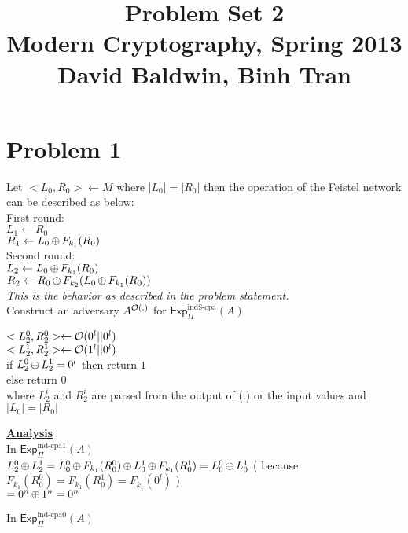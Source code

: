 \documentclass[11pt]{article}
\title{\bf Problem Set 2 \\[2ex] 
       \rm\normalsize Modern Cryptography, Spring 2013\\
       David Baldwin, Binh Tran}
\date{}
\author{}
\newcommand{\ExpINDz}[2]{\mathsf{Exp}^{\mathrm{ind}\mbox{-}\mathrm{cpa0}}_{#1}{(#2)}}
\newcommand{\ExpINDo}[2]{\mathsf{Exp}^{\mathrm{ind}\mbox{-}\mathrm{cpa1}}_{#1}{(#2)}}
\begin{document}
\maketitle


\vspace*{-1in}

\section*{Problem 1}


Let $<L_0,R_0> \gets M$ where $\left | L_0 \right | = \left | R_0 \right |$ then the operation of the Feistel network can be described as below: \\
First round: \\
$L_1 \gets R_0 $ \\
$R_1 \gets L_0 {\,\oplus\,} F_{k_1}(R_0)$ \\
Second round: \\
$L_2 \gets L_0 {\,\oplus\,} F_{k_1}(R_0)$ \\
$R_2 \gets R_0 {\,\oplus\,} F_{k_2}(L_0 {\,\oplus\,} F_{k_1}(R_0))$ \\

\textit{This is the behavior as described in the problem statement.}\\


Construct an adversary  $A^{{\cal O}(.)}$ for $\mathsf{Exp}^{\mathrm{ind\$}\mbox{-}\mathrm{cpa}}_{\Pi}{(A)}$


$<L_2^0,R_2^0> \gets {\cal O}(0^l||0^l)$ \\
$<L_2^1,R_2^1> \gets {\cal O}(1^l||0^l)$ \\
if $ L_2^0 {\,\oplus\,} L_2^1 = 0^l $ then return $1$ \\
else return $0$\\

where $L_2^i$ and $R_2^i$ are parsed from the output of \calO (.) or the input values and $\left | L_0 \right | = \left | R_0 \right |$

{\bf \underline{Analysis}}\\

In $\ExpINDo{\Pi}{A}$ \\

$L_2^0 {\,\oplus\,} L_2^1 = L_0^0 {\,\oplus\,}  F_{k_1}(R_0^0) {\,\oplus\,} L_0^1 {\,\oplus\,}  F_{k_1}(R_0^1) \\
= L_0^0 {\,\oplus\,} L_0^1$ ( because $F_{k_1}(R_0^0) = F_{k_1}(R_0^1) = F_{k_1}(0^l)$ )\\
$= 0^n {\,\oplus\,} 1^n = 0^n$

In $\ExpINDz{\Pi}{A}$ \\
\end{document}

